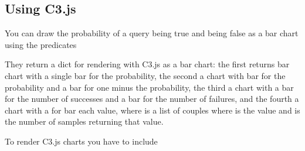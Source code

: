 \documentclass[letterpaper,10pt,english]{sphinxmanual}
\begin{document}
\subsection{Using C3.js}
\label{\detokenize{index:using-c3-js}}
\sphinxAtStartPar
You can draw the probability of a query being true and being false as a bar chart using the predicates

\begin{sphinxVerbatim}[commandchars=\\\{\}]
  
  
  
  
\end{sphinxVerbatim}

\sphinxAtStartPar
They return a dict for rendering with C3.js as a bar chart: the first returns bar chart with a single bar for the probability, the second a chart with bar for the probability and a bar for one minus the probability, the third a chart with a bar for the number of successes and a bar for the number of failures, and the fourth a chart with a for bar each value, where  is a list of couples  where  is the value and  is the number of samples returning that value.

\sphinxAtStartPar
To render C3.js charts you have to include

\begin{sphinxVerbatim}[commandchars=\\\{\}]
 
\end{sphinxVerbatim}
\end{document}
